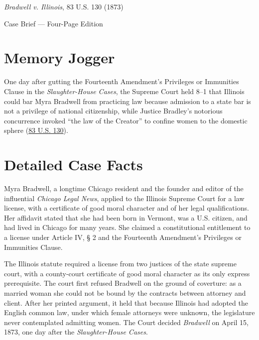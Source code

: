 \documentclass[12pt]{article}
\begin{document}
\begin{center}
{\LARGE \textit{Bradwell v. Illinois}, 83 U.S. 130 (1873)\par}
\vspace{0.8em}
{\large Case Brief --- Four-Page Edition\par}
\end{center}
\vspace{1em}

\section{Memory Jogger}

One day after gutting the Fourteenth Amendment's Privileges or Immunities Clause in the \textit{Slaughter-House Cases}, the Supreme Court held 8--1 that Illinois could bar Myra Bradwell from practicing law because admission to a state bar is not a privilege of national citizenship, while Justice Bradley's notorious concurrence invoked ``the law of the Creator'' to confine women to the domestic sphere (\href{https://supreme.justia.com/cases/federal/us/83/130/}{83 U.S. 130}).

\section{Detailed Case Facts}

Myra Bradwell, a longtime Chicago resident and the founder and editor of the influential \textit{Chicago Legal News}, applied to the Illinois Supreme Court for a law license, with a certificate of good moral character and of her legal qualifications. Her affidavit stated that she had been born in Vermont, was a U.S. citizen, and had lived in Chicago for many years. She claimed a constitutional entitlement to a license under Article IV, \S{} 2 and the Fourteenth Amendment's Privileges or Immunities Clause.

The Illinois statute required a license from two justices of the state supreme court, with a county-court certificate of good moral character as its only express prerequisite. The court first refused Bradwell on the ground of coverture: as a married woman she could not be bound by the contracts between attorney and client. After her printed argument, it held that because Illinois had adopted the English common law, under which female attorneys were unknown, the legislature never contemplated admitting women. The Court decided \textit{Bradwell} on April 15, 1873, one day after the \textit{Slaughter-House Cases}.
\end{document}
